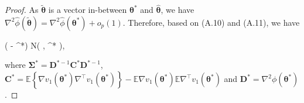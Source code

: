 \documentclass{article}
\newcommand{\wh}{\widehat}
\newcommand{\itl}{\intercal}
\newcommand{\bs}{ \boldsymbol}
\newcommand{\lt}{\left}
\newcommand{\rt}{\right}
\begin{document}
\begin{appendices}
\begin{proof}
	As $\tilde{\bs{\theta}}$ is a vector in-between $\bs{\theta}^*$ and $\wh{\bs{\theta}}$, we have $\nabla^2\wh{\phi}(\tilde{\bs{\theta}}) = \nabla^2\wh{\phi}(\bs{\theta}^*) + o_p(1)$. Therefore, based on (A.10) and (A.11), we have 
	\begin{flalign*}
	\lt(\widehat{\bs{\theta}} - \bs{\theta}^*\rt)  N\lt(\bs{0}, \bs{\Sigma}^* \rt),
	\end{flalign*}
	where $\bs{\Sigma}^* = \bs{D}^{*-1}\bs{C}^{*}\bs{D}^{*-1}$, 
	$\bs{C}^* =\mathbb{E}\lt\{  \nabla v_1(\bs{\theta}^*)\nabla^{\itl} v_1(\bs{\theta}^*) \rt\} - \mathbb{E}\nabla v_1(\bs{\theta}^*) \mathbb{E}\nabla^{\itl} v_1(\bs{\theta}^*)$ and $\bs{D}^*  =  \nabla^2 \phi(\bs{\theta}^*)$.
\end{proof}
\end{appendices}
\end{document}
